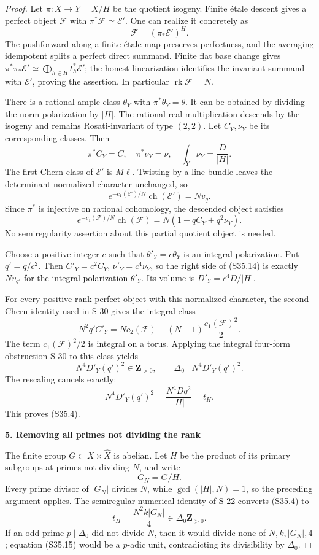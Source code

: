 \documentclass[11pt,a4paper]{article}
\theoremstyle{definition}
\begin{document}
\begin{proof}
Let \(\pi:X\to Y=X/H\) be the quotient isogeny. Finite étale descent gives a perfect object \(\mathcal F\) with \(\pi^*\mathcal F\simeq\mathcal E'\). One can realize it concretely as \[
 \mathcal F=(\pi_*\mathcal E')^H.
 \tag{S35.12}
\] The pushforward along a finite étale map preserves perfectness, and the averaging idempotent splits a perfect direct summand. Finite flat base change gives \(\pi^*\pi_*\mathcal E'\simeq\bigoplus_{h\in H}t_h^*\mathcal E'\); the honest linearization identifies the invariant summand with \(\mathcal E'\), proving the assertion. In particular \(\operatorname{rk}\mathcal F=N\).

There is a rational ample class \(\theta_Y\) with \(\pi^*\theta_Y=\theta\). It can be obtained by dividing the norm polarization by \(|H|\). The rational real multiplication descends by the isogeny and remains Rosati-invariant of type \((2,2)\). Let \(C_Y,\nu_Y\) be its corresponding classes. Then \[
 \pi^*C_Y=C,\quad \pi^*\nu_Y=\nu,\quad
 \int_Y\nu_Y=\frac D{|H|}.
 \tag{S35.13}
\] The first Chern class of \(\mathcal E'\) is \(M\ell\). Twisting by a line bundle leaves the determinant-normalized character unchanged, so \[
 e^{-c_1(\mathcal E')/N}\operatorname{ch}(\mathcal E')=Nv_q.
\] Since \(\pi^*\) is injective on rational cohomology, the descended object satisfies \[
 e^{-c_1(\mathcal F)/N}\operatorname{ch}(\mathcal F)
       =N(1-qC_Y+q^2\nu_Y).
 \tag{S35.14}
\] No semiregularity assertion about this partial quotient object is needed.

Choose a positive integer \(c\) such that \(\theta'_Y=c\theta_Y\) is an integral polarization. Put \(q'=q/c^2\). Then \(C'_Y=c^2C_Y\), \(\nu'_Y=c^4\nu_Y\), so the right side of (S35.14) is exactly \(Nv_{q'}\) for the integral polarization \(\theta'_Y\). Its volume is \(D'_Y=c^4D/|H|\).

For every positive-rank perfect object with this normalized character, the second-Chern identity used in S-30 gives the integral class \[
 N^2q'C'_Y
     =N c_2(\mathcal F)
        -(N-1)\frac{c_1(\mathcal F)^2}{2}.
\] The term \(c_1(\mathcal F)^2/2\) is integral on a torus. Applying the integral four-form obstruction S-30 to this class yields \[
 N^4D'_Y(q')^2\in\mathbf Z_{>0},
 \qquad \Delta_0\mid N^4D'_Y(q')^2.
\] The rescaling cancels exactly: \[
 N^4D'_Y(q')^2=\frac{N^4Dq^2}{|H|}=t_H.
\] This proves (S35.4).

\par\medskip\noindent\textbf{5. Removing all primes not dividing the rank}\quad

The finite group \(G\subset X\times\widehat X\) is abelian. Let \(H\) be the product of its primary subgroups at primes not dividing \(N\), and write \[
 G_N=G/H.
\] Every prime divisor of \(|G_N|\) divides \(N\), while \(\gcd(|H|,N)=1\), so the preceding argument applies. The semiregular numerical identity of S-22 converts (S35.4) to \[
 t_H=\frac{N^2 k |G_N|}{4}\in\Delta_0\mathbf Z_{>0}.
 \tag{S35.15}
\] If an odd prime \(p\mid\Delta_0\) did not divide \(N\), then it would divide none of \(N,k,|G_N|,4\); equation (S35.15) would be a \(p\)-adic unit, contradicting its divisibility by \(\Delta_0\).


\end{proof}
\end{document}
